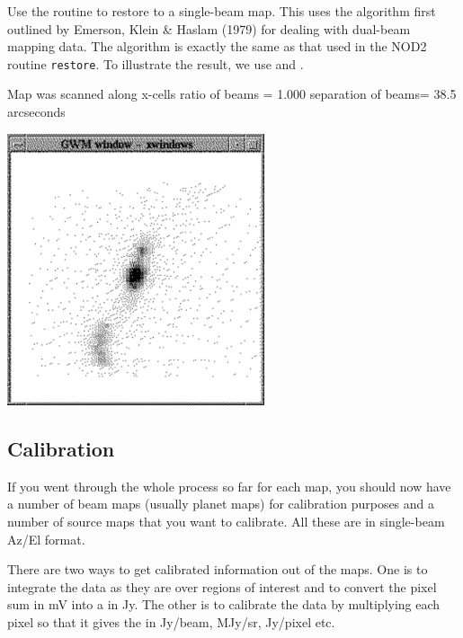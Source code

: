 \documentclass[11pt,noabs]{starlink}
\providecommand{\htmltex}[1]{}
\begin{document}
   Use the routine
\texttt{}
   to restore to a single-beam map. This uses the algorithm first outlined by
\htmltex{\ref{reference}}Emerson, Klein \& Haslam (1979){}
   for dealing with dual-beam mapping data. The algorithm is exactly the
   same as that used in the NOD2 routine \texttt{restore}. To illustrate
   the result, we use
\texttt{}
   and
\texttt{}.

\begin{terminalv}
Map was scanned along x-cells
ratio of beams = 1.000
separation of beams=  38.5 arcseconds
\end{terminalv}

\begin{center}
\leavevmode\includegraphics[height=80mm]{sc1_display4}
\end{center}

\subsection{\label{calib}Calibration}

   If you went through the whole process so far for each map, you should
   now have a number of beam maps (usually planet maps) for calibration
   purposes and a number of source maps that you want to calibrate. All
   these are in single-beam Az/El format.

   There are two ways to get calibrated information out of the maps. One
   is to integrate the data as they are over regions of interest and to
   convert the pixel sum in mV into a
   in Jy. The other is to calibrate the data by multiplying each pixel
   so that it gives the
   in Jy/beam, MJy/sr, Jy/pixel etc.
\end{document}
